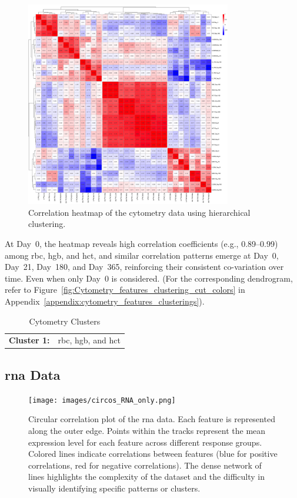 \documentclass[12pt,a4paper]{report}
\begin{document}
\begin{figure}[H]
  \centering
  \includegraphics[width=0.8\textwidth]{images/Cytometry_euclidean_distance.png}
  \caption[cytometry data correlations]{Correlation heatmap of the cytometry data using hierarchical clustering.}
  \label{fig:cytometry_heatmap}
\end{figure}
\noindent
At Day~0, the heatmap reveals high correlation coefficients (e.g., 0.89--0.99) among \acrshort{rbc}, \acrshort{hgb}, and \acrshort{hct}, and similar correlation patterns emerge at Day~0, Day~21, Day~180, and Day~365, reinforcing their consistent co-variation over time. Even when only Day~0 is considered. (For the corresponding dendrogram, refer to Figure~\ref{fig:Cytometry_features_clustering_cut_colors} in Appendix~\ref{appendix:cytometry_features_clusterings}).
\begin{table}[h!]
    \centering
    \begin{tabular}{ll}
        \textbf{Cluster 1:} &  \acrshort{rbc}, \acrshort{hgb}, and \acrshort{hct}
    \end{tabular}
    \caption{Cytometry Clusters}
    \label{tab:cytometry_clusters}
\end{table}



\subsection{\acrshort{rna} Data}
\begin{figure}[H]
  \centering
  \texttt{[image: images/circos\_RNA\_only.png]}
 \caption[\acrshort{rna} data correlations circular]{Circular correlation plot of the \acrshort{rna} data. Each feature is represented along the outer edge. Points within the tracks represent the mean expression level for each feature across different response groups. Colored lines indicate correlations between features (blue for positive correlations, red for negative correlations). The dense network of lines highlights the complexity of the dataset and the difficulty in visually identifying specific patterns or clusters.}
  \label{fig:rna_circos}
\end{figure}
\end{document}
